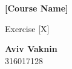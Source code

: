 \documentclass[a4paper, 12pt]{article}
\begin{document}
    \begin{center}
        \vspace*{4.4cm}
            
        \Huge
        \textbf{[Course Name]}
            
        \vspace{0.5cm}
        \LARGE
        Exercise [X]

        \vfill
            
        \Large
        \textbf{Aviv Vaknin}\\316017128
                    
    \end{center}
\end{document}

